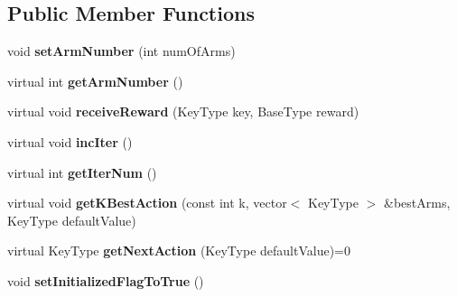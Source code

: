 \subsection*{Public Member Functions}
\begin{DoxyCompactItemize}
\item 
\hypertarget{classMultiBoost_1_1GenericBanditAlgorithmLS_af056dcc9da776e5515c58d6d1be659b5}{void {\bfseries set\-Arm\-Number} (int num\-Of\-Arms)}\label{classMultiBoost_1_1GenericBanditAlgorithmLS_af056dcc9da776e5515c58d6d1be659b5}

\item 
\hypertarget{classMultiBoost_1_1GenericBanditAlgorithmLS_a78d88d32f5ca2e1a1665371f693df1a8}{virtual int {\bfseries get\-Arm\-Number} ()}\label{classMultiBoost_1_1GenericBanditAlgorithmLS_a78d88d32f5ca2e1a1665371f693df1a8}

\item 
\hypertarget{classMultiBoost_1_1GenericBanditAlgorithmLS_a44aee8bc490395bb7039fdb733422708}{virtual void {\bfseries receive\-Reward} (Key\-Type key, Base\-Type reward)}\label{classMultiBoost_1_1GenericBanditAlgorithmLS_a44aee8bc490395bb7039fdb733422708}

\item 
\hypertarget{classMultiBoost_1_1GenericBanditAlgorithmLS_a59000da1d4bd878b0c29c0402aab83ab}{virtual void {\bfseries inc\-Iter} ()}\label{classMultiBoost_1_1GenericBanditAlgorithmLS_a59000da1d4bd878b0c29c0402aab83ab}

\item 
\hypertarget{classMultiBoost_1_1GenericBanditAlgorithmLS_a95db59af756df85afeee5303a88e1284}{virtual int {\bfseries get\-Iter\-Num} ()}\label{classMultiBoost_1_1GenericBanditAlgorithmLS_a95db59af756df85afeee5303a88e1284}

\item 
\hypertarget{classMultiBoost_1_1GenericBanditAlgorithmLS_aca8ffdbefba1eb6d2251708ee37bda5e}{virtual void {\bfseries get\-K\-Best\-Action} (const int k, vector$<$ Key\-Type $>$ \&best\-Arms, Key\-Type default\-Value)}\label{classMultiBoost_1_1GenericBanditAlgorithmLS_aca8ffdbefba1eb6d2251708ee37bda5e}

\item 
\hypertarget{classMultiBoost_1_1GenericBanditAlgorithmLS_ac317eb2f4e04375f02cde0547f2c17a9}{virtual Key\-Type {\bfseries get\-Next\-Action} (Key\-Type default\-Value)=0}\label{classMultiBoost_1_1GenericBanditAlgorithmLS_ac317eb2f4e04375f02cde0547f2c17a9}

\item 
\hypertarget{classMultiBoost_1_1GenericBanditAlgorithmLS_a858b5a501243de5a1aaec0af4e2ec902}{void {\bfseries set\-Initialized\-Flag\-To\-True} ()}\label{classMultiBoost_1_1GenericBanditAlgorithmLS_a858b5a501243de5a1aaec0af4e2ec902}


\end{DoxyCompactItemize}

